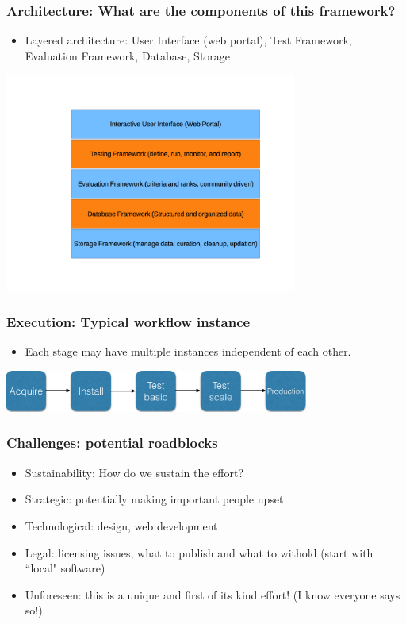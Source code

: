 \documentclass[hyperref={pdfpagelabels=false},12pt]{beamer}
\begin{document}
\begin{frame}
\frametitle{Architecture: What are the components of this framework?}
\begin{itemize}
\item 
Layered architecture: User Interface (web portal), Test Framework, Evaluation Framework, Database, Storage
\end{itemize}
\includegraphics[width=9.6cm]{Architecture}
\end{frame}

\begin{frame}
\frametitle{Execution: Typical workflow instance}
\begin{itemize}
\item
Each stage may have multiple instances independent of each other.
\end{itemize}
\vspace{1em}
\includegraphics[width=10cm]{workflow}
\end{frame}

\begin{frame}
\frametitle{Challenges: potential roadblocks}
\begin{itemize}
\itemsep1em
\item
 Sustainability: How do we sustain the effort?
\item 
Strategic: potentially making important people upset
\item
Technological: design, web development
\item
Legal: licensing issues, what to publish and what to withold (start with ``local" software)
\item
Unforeseen: this is a unique and first of its kind effort! (I know everyone says so!)
\end{itemize}
\end{frame}
\end{document}
